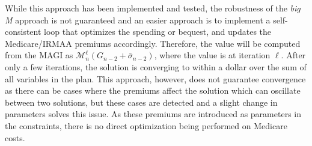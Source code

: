 \documentclass{report}[fleqn,12pt]
\begin{document}
\begin{description}[leftmargin=4em,style=multiline]
	While this approach has been implemented and tested, the robustness of the {\em big M} approach
	is not guaranteed and an easier approach is to implement a self-consistent loop that
	optimizes the spending or bequest, and updates the Medicare/IRMAA premiums accordingly.
	Therefore, the value will be computed from the MAGI
	as $\mathcal{M}_n^\ell(G_{n-2} + \bar{\sigma}_{n-2})$, where the value is at iteration $\ell$.
	After only a few iterations, the solution is converging to within a dollar over the
	sum of all variables in the plan. This approach, however, does not guarantee convergence
	as there can be cases where the premiums affect the solution which can oscillate between
	two solutions, but these cases are detected and a slight change in parameters
	solves this issue. As these premiums are introduced as parameters in the constraints,
	there is no direct optimization being performed on Medicare costs.
\end{description}
\end{document}
